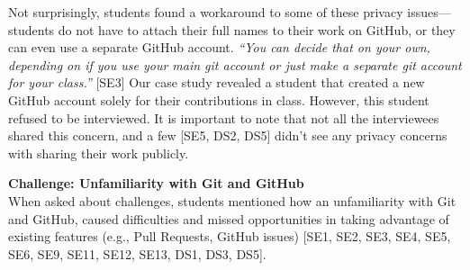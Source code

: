 

Not surprisingly, students found a workaround to some of these privacy issues---students do not have to attach their full names to their work on GitHub, or they can even use a separate GitHub account. \textit{``You can decide that on your own, depending on if you use your main git account or just make a separate git account for your class.''} [SE3] Our case study revealed a student that created a new GitHub account solely for their contributions in class. However, this student refused to be interviewed.
It is important to note that not all the interviewees shared this concern, and a few [SE5, DS2, DS5] didn't see any privacy concerns with sharing their work publicly.


\textbf{Challenge: Unfamiliarity with Git and GitHub}\\
When asked about challenges, students mentioned how an unfamiliarity with Git and GitHub, caused difficulties and missed opportunities in taking advantage of existing features (e.g., Pull Requests, GitHub issues) [SE1, SE2, SE3, SE4, SE5, SE6, SE9, SE11, SE12, SE13, DS1, DS3, DS5].

